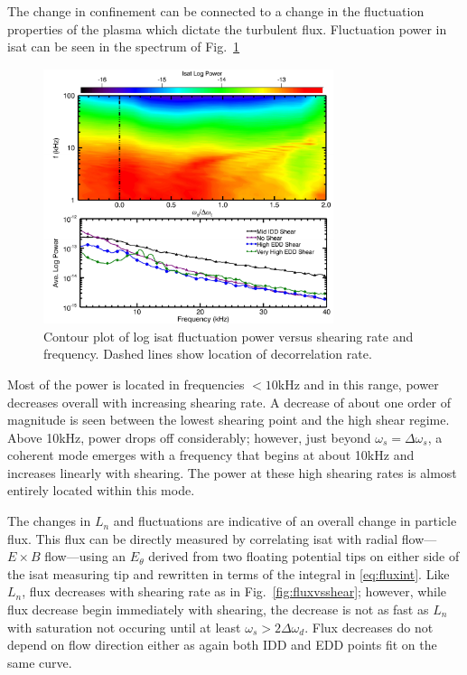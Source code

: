 \documentclass[%
 aps,
 prl,
 amsmath,amssymb,
 reprint,%
]{revtex4-1}
\begin{document}
The change in confinement can be connected to a change in the fluctuation properties of the plasma which dictate the turbulent flux. Fluctuation power in isat can be seen in the spectrum of Fig.~\ref{fig:powercontour}
\begin{figure}
\begin{center}
\includegraphics[width=8.5cm]{powercontour.pdf}%
\caption{\label{fig:powercontour} Contour plot of log isat fluctuation power versus shearing rate and frequency. Dashed lines show location of decorrelation rate.}
\end{center}
\end{figure}
Most of the power is located in frequencies $<10$kHz and in this range, power decreases overall with increasing shearing rate. A decrease of about one order of magnitude is seen between the lowest shearing point and the high shear regime. Above 10kHz, power drops off considerably; however, just beyond $\omega_{s} = \Delta \omega_{s}$, a coherent mode emerges with a frequency that begins at about 10kHz and increases linearly with shearing. The power at these high shearing rates is almost entirely located within this mode.

The changes in $L_{n}$ and fluctuations are indicative of an overall change in particle flux. This flux can be directly measured by correlating isat with radial flow---$E \times B$ flow---using an $E_{\theta}$ derived from two floating potential tips on either side of the isat measuring tip and rewritten in terms of the integral in \eqref{eq:fluxint}. Like $L_{n}$, flux decreases with shearing rate as in Fig.~\ref{fig:fluxvsshear}; however, while flux decrease begin immediately with shearing, the decrease is not as fast as $L_{n}$ with saturation not occuring until at least $\omega_{s} > 2\Delta \omega_{d}$. Flux decreases do not depend on flow direction either as again both IDD and EDD points fit on the same curve.
\end{document}

